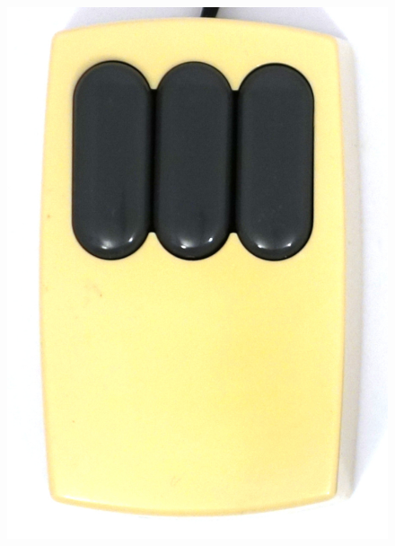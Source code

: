 \documentclass[11pt, a4paper]{article}
\begin{document}
\begin{figure}[h]
    \centering
    \includegraphics[scale=0.4]{1981_xerox_alto_mouse/top_30.jpg}

\end{figure}
\end{document}
